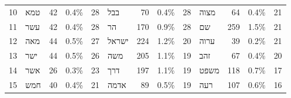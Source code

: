 \begin{table}[htbp!]
\begin{adjustbox}{width=1\textwidth}
\begin{tabular}{llrlrlrlrlrlr}
10   &   \texthebrew{טמא} &     42 &  0.4\% &      28 &     \texthebrew{בבל} &     70 &  0.4\% &      28 &  \texthebrew{מצוה} &     64 &  0.4\% &      21 \\
11   &   \texthebrew{עשר} &     42 &  0.4\% &      28 &      \texthebrew{הר} &    170 &  0.9\% &      28 &    \texthebrew{שם} &    259 &  1.5\% &      21 \\
12   &   \texthebrew{מאה} &     44 &  0.5\% &      27 &   \texthebrew{ישראל} &    224 &  1.2\% &      20 &  \texthebrew{ערוה} &     39 &  0.2\% &      21 \\
13   &   \texthebrew{ישר} &     44 &  0.5\% &      26 &     \texthebrew{משה} &    205 &  1.1\% &      19 &   \texthebrew{זהב} &     67 &  0.4\% &      20 \\
14   &   \texthebrew{אשר} &     26 &  0.3\% &      23 &     \texthebrew{דרך} &    197 &  1.1\% &      19 &  \texthebrew{משפט} &    118 &  0.7\% &      17 \\
15   &   \texthebrew{חמש} &     40 &  0.4\% &      21 &    \texthebrew{אדמה} &     89 &  0.5\% &      19 &   \texthebrew{רעה} &    107 &  0.6\% &      16 \\
\bottomrule
\end{tabular}
\end{adjustbox}
\end{table}
